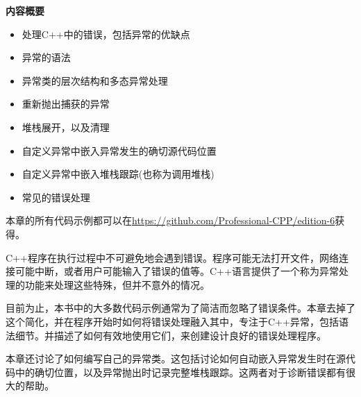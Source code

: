 \noindent
\textbf{内容概要}

\begin{itemize}
\item
处理C++中的错误，包括异常的优缺点

\item
异常的语法

\item
异常类的层次结构和多态异常处理

\item
重新抛出捕获的异常

\item
堆栈展开，以及清理

\item
自定义异常中嵌入异常发生的确切源代码位置

\item
自定义异常中嵌入堆栈跟踪(也称为调用堆栈)

\item
常见的错误处理
\end{itemize}

本章的所有代码示例都可以在\url{https://github.com/Professional-CPP/edition-6}获得。

C++程序在执行过程中不可避免地会遇到错误。程序可能无法打开文件，网络连接可能中断，或者用户可能输入了错误的值等。C++语言提供了一个称为异常处理的功能来处理这些特殊，但并不意外的情况。

目前为止，本书中的大多数代码示例通常为了简洁而忽略了错误条件。本章去掉了这个简化，并在程序开始时如何将错误处理融入其中，专注于C++异常，包括语法细节。并描述了如何有效地使用它们，来创建设计良好的错误处理程序。

本章还讨论了如何编写自己的异常类。这包括讨论如何自动嵌入异常发生时在源代码中的确切位置，以及异常抛出时记录完整堆栈跟踪。这两者对于诊断错误都有很大的帮助。












